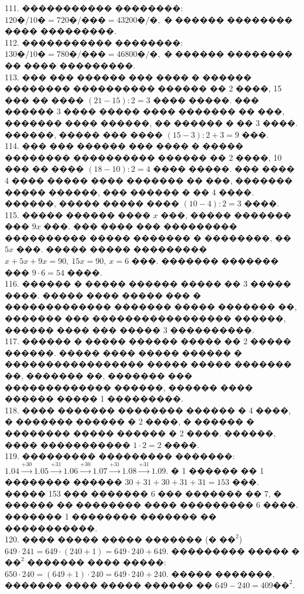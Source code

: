 \documentclass[12pt]{article}
\begin{document}
111. ����������� ��������: $120\text{�}/10\text{�}=720\text{�}/\text{���}=43200\text{�}/\text{�},$ � ������ �������� ���� ���������.\\
112. ����������� ��������: $130\text{�}/10\text{�}=780\text{�}/\text{���}=46800\text{�}/\text{�},$ � ������ �������� �� ���� ���������.\\
113. ��� ��� ������ ��� ���� � ������ �������� ���������� ������ �� 2 ����, 15 ��� �� ���� $(21-15):2=3$ ���� �����. ��� ������ 3 ���� ����� ���� ������� �� ���, ������� ���� ������, �� ������ � �� 3 ����. ������, ����� ��� ���� $(15-3):2+3=9$ ���.\\
114. ��� ��� ������ ��� ���� � ����� �������� ���������� ������ �� 2 ����, 10 ��� �� ���� $(18-10):2=4$ ���� �����. ��� ���� 4 ���� ����� ���� ������� �� ���, ������� ����� ������, ��� ������ � �� 4 ����. ������, ����� ����� ���� $(10-4):2=3$ ����.\\
115. ����� ������ ���� $x$ ���, ����� ������� ��� $9x$ ���. ��� ���� ��� ��������� ���������� ����� ������� � ��������, �� $5x$ ���. ����� ����� ��������� $x+5x+9x=90,\ 15x=90,\ x=6$ ���. ������� ������� ��� $9\cdot6=54$ ����.\\
116. ������ � ����� ������ ����� �� 3 ����� ����. ����� ���� ����� ��� � ������������� ������� ����� ������� ��, ������� ��� ����������������� ������, ������ ���� ��� ����� 3 ����������.\\
117. ������ � ����� ������ ����� �� 2 ����� ������. ����� ���� ����� ������ � ����������������� ����� ����� ������� ��, ������� ��, ������� ��� ������������� ������, ������ ���� ������ ����� 1 ���������.\\
118. ���� ������� �������� ������ � 4 ����, � ������� ������ � 2 ����, � ������ � �������� ����� ������ � 2 ����. ������, ���� ����������� $1\cdot2=2$ ����.\\
119. ��������� ��������� �������: $1.04\stackrel{+30}{\rightarrow}1.05\stackrel{+31}{\rightarrow}1.06\stackrel{+30}{\rightarrow}1.07\stackrel{+31}{\rightarrow}1.08\stackrel{+31}{\rightarrow}1.09.$
� 1 ������ �� 1 �������� ������ $30+31+30+31+31=153$ ���. ����� 153 ��� ������� 6 ��� ������� �� 7, � ������ �� �������� ���� ��������� 6 ����. ������� 1 �������� ������� �� �����������.\\
120. ���� ����� ����� ������� (� $\text{��}^2$) $649\cdot241=649\cdot(240+1)=649\cdot240+649.$ ��������� ����� � $\text{��}^2$ ������� ���� �����:
$650\cdot240=(649+1)\cdot240=649\cdot240+240.$ ����� �������, ������� ���� ����� ������ �� $649-240=409\text{��}^2.$\\
\end{document}

